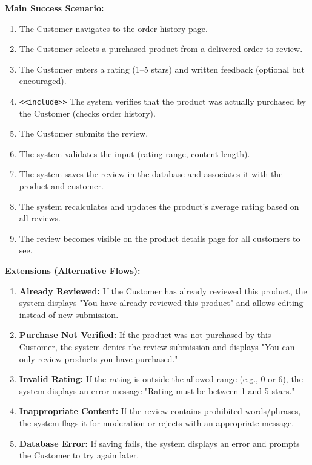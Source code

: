 \textbf{Main Success Scenario:}
\begin{enumerate}
    \item The Customer navigates to the order history page.
    \item The Customer selects a purchased product from a delivered order to review.
    \item The Customer enters a rating (1–5 stars) and written feedback (optional but encouraged).
    \item \texttt{\textless\textless include\textgreater\textgreater} The system verifies that the product was actually purchased by the Customer (checks order history).
    \item The Customer submits the review.
    \item The system validates the input (rating range, content length).
    \item The system saves the review in the database and associates it with the product and customer.
    \item The system recalculates and updates the product's average rating based on all reviews.
    \item The review becomes visible on the product details page for all customers to see.
\end{enumerate}

\textbf{Extensions (Alternative Flows):}
\begin{enumerate}
    \item[2a.] \textbf{Already Reviewed:} If the Customer has already reviewed this product, the system displays "You have already reviewed this product" and allows editing instead of new submission.
    
    \item[4a.] \textbf{Purchase Not Verified:} If the product was not purchased by this Customer, the system denies the review submission and displays "You can only review products you have purchased."
    
    \item[6a.] \textbf{Invalid Rating:} If the rating is outside the allowed range (e.g., 0 or 6), the system displays an error message "Rating must be between 1 and 5 stars."
    
    \item[6b.] \textbf{Inappropriate Content:} If the review contains prohibited words/phrases, the system flags it for moderation or rejects with an appropriate message.
    
    \item[7a.] \textbf{Database Error:} If saving fails, the system displays an error and prompts the Customer to try again later.
\end{enumerate}

